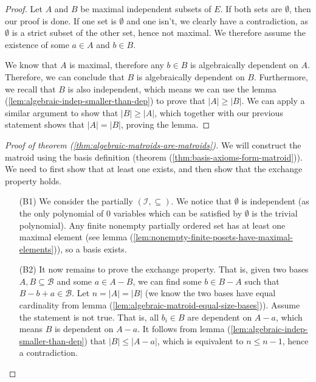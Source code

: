 \begin{proof}
	Let $A$ and $B$ be maximal independent subsets of $E$. If both sets are $\emptyset$, then our proof is done. If one set is $\emptyset$ and one isn't, we clearly have a contradiction, as $\emptyset$ is a strict subset of the other set, hence not maximal. We therefore assume the existence of some $a \in A$ and $b \in B$.

	We know that $A$ is maximal, therefore any $b \in B$ is algebraically dependent on $A$. Therefore, we can conclude that $B$ is algebraically dependent on $B$. Furthermore, we recall that $B$ is also independent, which means we can use the lemma (\ref{lem:algebraic-indep-smaller-than-dep}) to prove that $|A| \geq |B|$. We can apply a similar argument to show that $|B| \geq |A|$, which together with our previous statement shows that $|A| = |B|$, proving the lemma.
\end{proof}

\begin{proof}[Proof of theorem (\ref{thm:algebraic-matroids-are-matroids})]
	We will construct the matroid using the basis definition (theorem (\ref{thm:basis-axioms-form-matroid})). We need to first show that at least one exists, and then show that the exchange property holds.
	\begin{enumerate}
		\item[(B1)] We consider the partially $(\mathcal I, \subseteq )$. We notice that $ \emptyset $ is independent (as the only polynomial of $0$ variables which can be satisfied by $\emptyset $ is the trivial polynomial). Any finite nonempty partially ordered set has at least one maximal element (see lemma (\ref{lem:nonempty-finite-posets-have-maximal-elements})), so a basis exists.
		\item[(B2)] It now remains to prove the exchange property. That is, given two bases $A, B \subseteq \mathcal B$ and some $a \in A - B$, we can find some $b \in B - A$ such that $B - b + a \in \mathcal B$. Let $n = |A| = |B|$ (we know the two bases have equal cardinality from lemma (\ref{lem:algebraic-matroid-equal-size-bases})). Assume the statement is not true. That is, all $b _i \in B$ are dependent on $A - a$, which means $B$ is dependent on $A - a$. It follows from lemma (\ref{lem:algebraic-indep-smaller-than-dep}) that $|B| \leq |A - a|$, which is equivalent to $n \leq n - 1$, hence a contradiction.
	\end{enumerate}
\end{proof}


